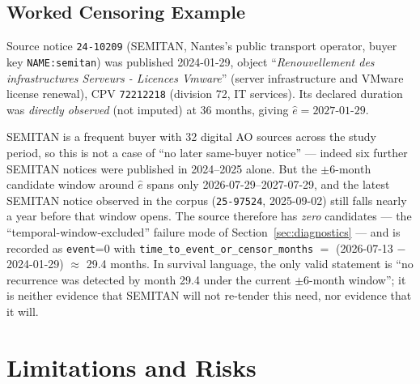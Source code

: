 \documentclass[11pt]{article}
\begin{document}
\subsection{Worked Censoring Example}
Source notice \texttt{24-10209} (SEMITAN, Nantes's public transport
operator, buyer key \texttt{NAME:semitan}) was published 2024-01-29, object
``\emph{Renouvellement des infrastructures Serveurs - Licences Vmware}''
(server infrastructure and VMware license renewal), CPV \texttt{72212218}
(division 72, IT services). Its declared duration was \emph{directly
observed} (not imputed) at 36 months, giving $\hat e = 2027\text{-}01\text{-}29$.

SEMITAN is a frequent buyer with 32 digital AO sources across the study
period, so this is not a case of ``no later same-buyer notice'' --- indeed
six further SEMITAN notices were published in 2024--2025 alone. But the
$\pm 6$-month candidate window around $\hat e$ spans only
2026-07-29--2027-07-29, and the latest SEMITAN notice observed in the
corpus (\texttt{25-97524}, 2025-09-02) still falls nearly a year before
that window opens. The source therefore has \emph{zero} candidates ---
the ``temporal-window-excluded'' failure mode of
Section~\ref{sec:diagnostics} --- and is recorded as \texttt{event}=0 with
\texttt{time\_to\_event\_or\_censor\_months} $=$ (2026-07-13
$-$ 2024-01-29) $\approx$ 29.4 months. In survival language, the only valid
statement is ``no recurrence was detected by month 29.4 under the current
$\pm 6$-month window''; it is neither evidence that SEMITAN will not
re-tender this need, nor evidence that it will.

\section{Limitations and Risks}
\label{sec:limitations}
\end{document}
